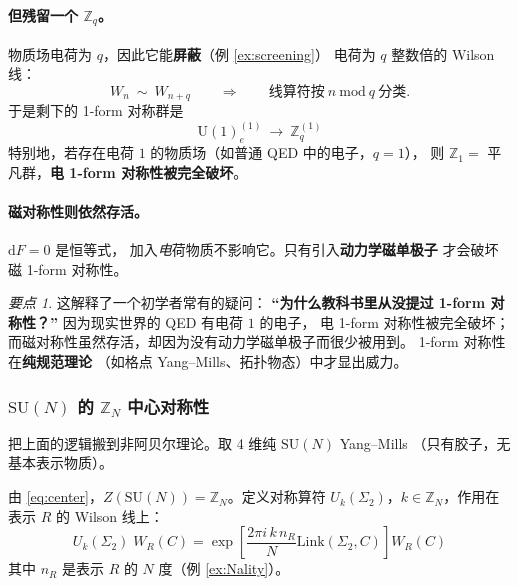 \documentclass[UTF8,a4paper,11pt]{ctexart}
\theoremstyle{plain}
\theoremstyle{definition}
\theoremstyle{remark}
\newtheorem{keypoint}{要点}[section]
\newcommand{\ext}{\mathrm{d}}          %
\newcommand{\Link}{\mathrm{Link}}
\newcommand{\ZZ}{\mathbb{Z}}
\newcommand{\Uone}{\mathrm{U}(1)}
\newcommand{\SUgrp}{\mathrm{SU}}
\newcommand{\Ssurf}{\Sigma}
\newcommand{\Uop}{U}
\begin{document}
\paragraph{但残留一个 $\ZZ_q$。}
物质场电荷为 $q$，因此它能\textbf{屏蔽}（例 \ref{ex:screening}）
电荷为 $q$ 整数倍的 Wilson 线：
\begin{equation}
  W_n\ \sim\ W_{n+q}
  \qquad\Longrightarrow\qquad
  \text{线算符按}\ n\ \mathrm{mod}\ q\ \text{分类}.
\end{equation}
于是剩下的 1-form 对称群是
\begin{equation}
  \boxed{\ \Uone_e^{(1)}\ \longrightarrow\ \ZZ_q^{(1)}\ }
  \label{eq:UtoZq}
\end{equation}
特别地，若存在电荷 $1$ 的物质场（如普通 QED 中的电子，$q=1$），
则 $\ZZ_1=$ 平凡群，\textbf{电 1-form 对称性被完全破坏}。

\paragraph{磁对称性则依然存活。}$\ext F=0$ 是恒等式，
加入\emph{电}荷物质不影响它。只有引入\textbf{动力学磁单极子}
才会破坏磁 1-form 对称性。

\begin{keypoint}
\label{kp:whypure}
这解释了一个初学者常有的疑问：
\textbf{“为什么教科书里从没提过 1-form 对称性？”}
因为现实世界的 QED 有电荷 $1$ 的电子，
电 1-form 对称性被完全破坏；
而磁对称性虽然存活，却因为没有动力学磁单极子而很少被用到。
1-form 对称性在\textbf{纯规范理论}
（如格点 Yang--Mills、拓扑物态）中才显出威力。
\end{keypoint}

\subsubsection{\texorpdfstring{$\SUgrp(N)$}{SU(N)} 的 \texorpdfstring{$\ZZ_N$}{ZN} 中心对称性}
\label{subsec:center}

把上面的逻辑搬到非阿贝尔理论。取 4 维纯 $\SUgrp(N)$ Yang--Mills
（只有胶子，无基本表示物质）。

由 \eqref{eq:center}，$Z(\SUgrp(N))=\ZZ_N$。定义对称算符
$\Uop_k(\Ssurf_2)$，$k\in\ZZ_N$，作用在表示 $R$ 的 Wilson 线上：
\begin{equation}
  \boxed{\
  \Uop_k(\Ssurf_2)\;W_R(C)
  =\exp\!\left[\frac{2\pi i\,k\,n_R}{N}\Link(\Ssurf_2,C)\right] W_R(C)\ }
  \label{eq:centeraction}
\end{equation}
其中 $n_R$ 是表示 $R$ 的 $N$ 度（例 \ref{ex:Nality}）。
\end{document}
